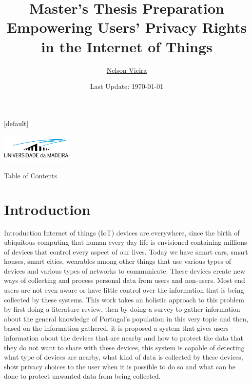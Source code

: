\documentclass[xcolor={svgnames},12pt,aspectratio=169,handout]{beamer}
\title[Empowering Users' Privacy Rights in the Internet of Things]{Master's Thesis Preparation \\ {\normalsize Empowering Users' Privacy Rights in the Internet of Things}}
\author{\href{mailto:2080511@student.uma.pt}{Nelson Vieira}}
\institute[\href{https://www.uma.pt/}{University of Madeira}]{University of Madeira\\Faculty of Exact Sciences and Engineering}
\date{Last Update: \today}
\makeatletter
\newenvironment{withoutheadline}{
        \setbeamertemplate{headline}[default]
        \def\beamer@entrycode{\vspace*{-\headheight}}
    }{}
\makeatother
\begin{document}
\begin{withoutheadline}
    \begin{frame}
        \centering\includegraphics[width=100pt]{../assets/images/uma_logo.png}
        \maketitle
    \end{frame}
\end{withoutheadline}

\begin{frame}{Table of Contents}
    \begin{multicols}{2}
        \tableofcontents
    \end{multicols}
\end{frame}

\section{Introduction}

\begin{frame}{Introduction}
    Internet of things (IoT) devices are everywhere, since the birth of ubiquitous
    computing that human every day life is envisioned containing millions of
    devices that control every aspect of our lives. Today we have smart cars,
    smart houses, smart cities, wearables among other things that use various
    types of devices and various types of networks to communicate. These devices
    create new ways of collecting and process personal data from users and
    non-users. Most end users are not even aware or have little control over
    the information that is being collected by these systems. This work takes
    an holistic approach to this problem by first doing a literature review,
    then by doing a survey to gather information about the general knowledge
    of Portugal's population in this very topic and then, based on the information
    gathered, it is proposed a system that gives users information about the
    devices that are nearby and how to protect the data that they do not want
    to share with these devices, this system is capable of detecting what type
    of devices are nearby, what kind of data is collected by these devices,
    show privacy choices to the user when it is possible to do so and what can
    be done to protect unwanted data from being collected.
\end{frame}
\end{document}
